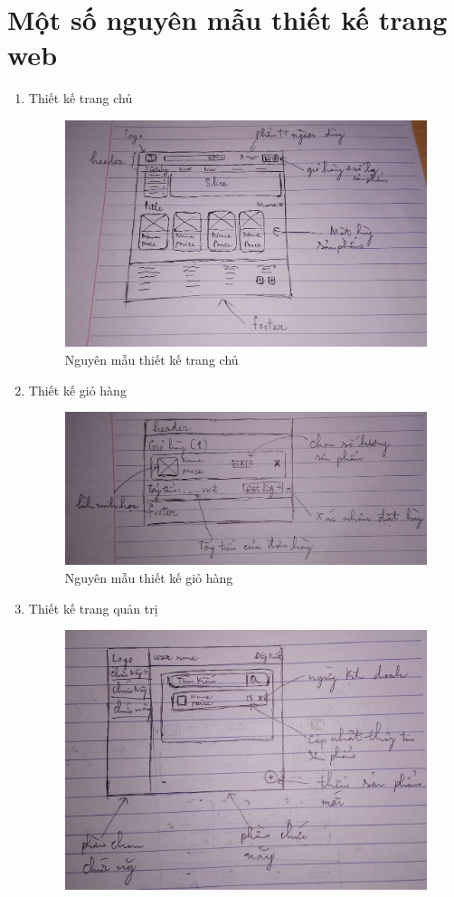 \section{Một số nguyên mẫu thiết kế trang web}
\begin{enumerate}[label=\textbf{\alph*)}]
    \item Thiết kế trang chủ
        \begin{figure}[h!]
	        \centering
	        \includegraphics[width=\linewidth]{fig/p_home.jpg}
	        \caption{Nguyên mẫu thiết kế trang chủ}
        \end{figure}
        \newpage
\item Thiết kế giỏ hàng
\begin{figure}[h!]
	\centering
	\includegraphics[width=\linewidth]{fig/p_cart.jpg}
	\caption{Nguyên mẫu thiết kế giỏ hàng}
\end{figure}
\item Thiết kế trang quản trị
\begin{figure}[h!]
	\centering
	\includegraphics[width=\linewidth]{fig/p_dashboard.jpg}

\end{figure}
\end{enumerate}
